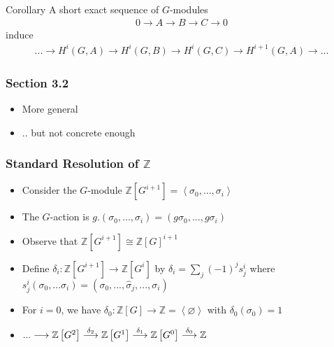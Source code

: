 \documentclass[10pt,xcolor=table,dvipsnames]{beamer}
\newenvironment{stepitemize}{\begin{itemize}[<+->]}{\end{itemize} }
\begin{document}
\begin{frame}[fragile]
        \begin{block}{Corollary}
                A short exact sequence of $G$-modules
                \begin{gather*}
                0\longrightarrow A \longrightarrow B \longrightarrow C \longrightarrow 0
                \end{gather*}
                induce
                \begin{gather*}
...\longrightarrow H^{i}\left( G,A\right) \longrightarrow H^{i}\left(
G,B\right) \longrightarrow H^{i}\left( G,C\right) \longrightarrow
H^{i+1}\left( G,A\right) \longrightarrow ...
                \end{gather*}
        \end{block}
\end{frame}

\begin{frame}
    \frametitle{Section 3.2}
\begin{stepitemize}
\item More general
\item .. but not concrete enough
\end{stepitemize}

\end{frame}

\begin{frame}
    \frametitle{Standard Resolution of $\mathbb{Z}$}
\begin{stepitemize}
\item Consider the $G$-module $\mathbb{Z}\left[ G^{i+1}\right] =\left\langle
\sigma _{0},...,\sigma _{i}\right\rangle $

\item The $G$-action is $g.\left( \sigma _{0},...,\sigma _{i}\right) =\left(
g\sigma _{0},...,g\sigma _{i}\right) $

\item Observe that $\mathbb{Z}\left[ G^{i+1}\right] \cong \mathbb{Z}\left[ G\right]
^{i+1}$

\item Define $\delta_{i}:\mathbb{Z}\left[ G^{i+1}\right] \longrightarrow \mathbb{Z%
}\left[ G^{i}\right] $ by $\delta_{i}=\sum\limits_{j}\left( -1\right)
^{j}s_{j}^{i}$ where $s_{j}^{i}\left( \sigma _{0},...\sigma _{i}\right)
=\left( \sigma _{0},...,\widehat{\sigma }_{j},...,\sigma
_{i}\right) $

\item For $i=0$, we have $\delta_{0}:\mathbb{Z}\left[ G\right] \longrightarrow
\mathbb{Z=}\left\langle \varnothing \right\rangle $ with $\delta_{0}\left(
\sigma _{0}\right) =1$

\item $...\longrightarrow \mathbb{Z}\left[ G^{2}\right] \overset{\delta_{2}}{%
\longrightarrow }\mathbb{Z}\left[ G^{1}\right] \overset{\delta_{1}}{%
\longrightarrow }\mathbb{Z}\left[ G^{0}\right] \overset{\delta_{0}}{%
\longrightarrow }\mathbb{Z} $
\end{stepitemize}

\end{frame}
\end{document}
